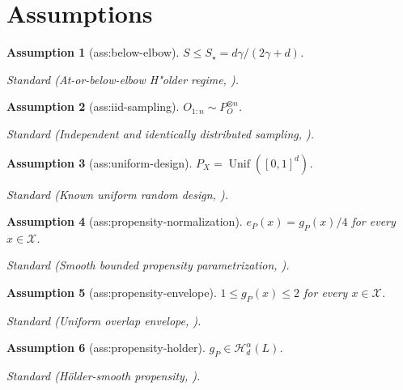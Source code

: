 \documentclass{article}
\newtheorem{assumption}{Assumption}
\begin{document}
\section{Assumptions}

\begin{assumption}[ass:below-elbow]\label{ass:below-elbow}
\(S\le S_{\star}=d\gamma/(2\gamma+d)\).
\par\smallskip\noindent\emph{Standard} (At-or-below-elbow H"older regime, \cite{KennedyBalakrishnanRobinsWasserman2024MinimaxCATE}).
\end{assumption}

\begin{assumption}[ass:iid-sampling]\label{ass:iid-sampling}
\(O_{1:n}\sim P_O^{\otimes n}\).
\par\smallskip\noindent\emph{Standard} (Independent and identically distributed sampling, \cite{KennedyBalakrishnanRobinsWasserman2024MinimaxCATE}).
\end{assumption}

\begin{assumption}[ass:uniform-design]\label{ass:uniform-design}
\(P_X=\operatorname{Unif}([0,1]^d)\).
\par\smallskip\noindent\emph{Standard} (Known uniform random design, \cite{KennedyBalakrishnanRobinsWasserman2024MinimaxCATE}).
\end{assumption}

\begin{assumption}[ass:propensity-normalization]\label{ass:propensity-normalization}
\(e_P(x)=g_P(x)/4\) for every \(x\in\mathcal X\).
\par\smallskip\noindent\emph{Standard} (Smooth bounded propensity parametrization, \cite{KennedyBalakrishnanRobinsWasserman2024MinimaxCATE}).
\end{assumption}

\begin{assumption}[ass:propensity-envelope]\label{ass:propensity-envelope}
\(1\le g_P(x)\le2\) for every \(x\in\mathcal X\).
\par\smallskip\noindent\emph{Standard} (Uniform overlap envelope, \cite{KennedyBalakrishnanRobinsWasserman2024MinimaxCATE}).
\end{assumption}

\begin{assumption}[ass:propensity-holder]\label{ass:propensity-holder}
\(g_P\in\mathcal H_d^{\alpha}(L)\).
\par\smallskip\noindent\emph{Standard} (H\"older-smooth propensity, \cite{KennedyBalakrishnanRobinsWasserman2024MinimaxCATE}).
\end{assumption}
\end{document}
